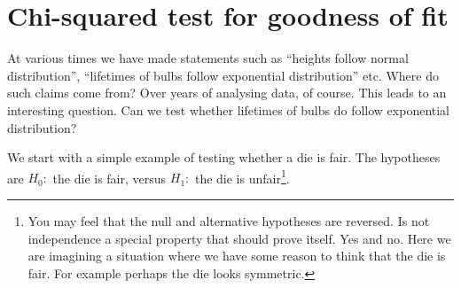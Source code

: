 \documentclass[preprint,  11pt]{amsart}
\theoremstyle{plain} %
\theoremstyle{definition} %
\begin{document}


%


\section{Chi-squared test for goodness of fit}
At various times we have made statements such as ``heights follow normal distribution'', ``lifetimes of bulbs follow exponential distribution'' etc. Where do such claims come from? Over years of analysing data, of course. This leads to an interesting question. Can we test whether  lifetimes of bulbs do follow exponential distribution? 

We start with a simple example of testing whether a die is fair.  The hypotheses are  $H_{0}:$ the die is fair, versus $H_{1}:$ the die is unfair\footnote{You may feel that the null and alternative hypotheses are reversed. Is not independence a special property that should prove itself. Yes and no. Here we are imagining a situation where we have some reason to think that the die is fair. For example perhaps the die looks symmetric.}.
\end{document}
